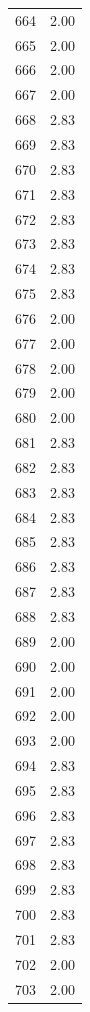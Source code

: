 \documentclass[a4paper,11pt]{article}
\begin{document}
\begin{center}
\begin{longtable}{|R{1.5cm}|R{2.5cm}|}
  664  &         2.00 \\ 
  665  &         2.00 \\ 
  666  &         2.00 \\ 
  667  &         2.00 \\ 
  668  &         2.83 \\ 
  669  &         2.83 \\ 
  670  &         2.83 \\ 
  671  &         2.83 \\ 
  672  &         2.83 \\ 
  673  &         2.83 \\ 
  674  &         2.83 \\ 
  675  &         2.83 \\ 
  676  &         2.00 \\ 
  677  &         2.00 \\ 
  678  &         2.00 \\ 
  679  &         2.00 \\ 
  680  &         2.00 \\ 
  681  &         2.83 \\ 
  682  &         2.83 \\ 
  683  &         2.83 \\ 
  684  &         2.83 \\ 
  685  &         2.83 \\ 
  686  &         2.83 \\ 
  687  &         2.83 \\ 
  688  &         2.83 \\ 
  689  &         2.00 \\ 
  690  &         2.00 \\ 
  691  &         2.00 \\ 
  692  &         2.00 \\ 
  693  &         2.00 \\ 
  694  &         2.83 \\ 
  695  &         2.83 \\ 
  696  &         2.83 \\ 
  697  &         2.83 \\ 
  698  &         2.83 \\ 
  699  &         2.83 \\ 
  700  &         2.83 \\ 
  701  &         2.83 \\ 
  702  &         2.00 \\ 
  703  &         2.00 \\ 

\end{longtable}
\end{center}
\end{document}
